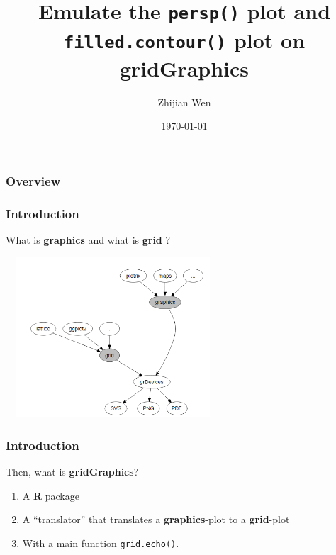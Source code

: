 \documentclass{beamer}
\title[Short title]{
Emulate the \texttt{persp()} plot and \texttt{filled.contour()} plot on \textbf{gridGraphics}
} %
\author{Zhijian Wen} %
\institute[UOA] %
{
University of Auckland \\ %
\medskip
\textit{jwen246@aucklanduni.ac.nz} %
}
\date{\today} %
\begin{document}


\begin{frame}
\titlepage %
\end{frame}

\begin{frame}
\frametitle{Overview} %
\tableofcontents %
\end{frame}



\begin{frame}[fragile]

\frametitle{Introduction}
What is \textbf{graphics} and what is \textbf{grid} ?
\begin{center}
\includegraphics[width = 8cm, height = 6cm]{plot/grid_and_graphics.PNG}
\end{center}

\end{frame}


\begin{frame}[fragile]
\frametitle{Introduction}
Then, what is \textbf{gridGraphics}? \\

\begin{enumerate}
	\item A \textbf{R} package 
	\item A ``translator'' that translates a \textbf{graphics}-plot to a \textbf{grid}-plot 
	\item With a main function \texttt{grid.echo()}.
\end{enumerate}

\end{frame}
\end{document}

